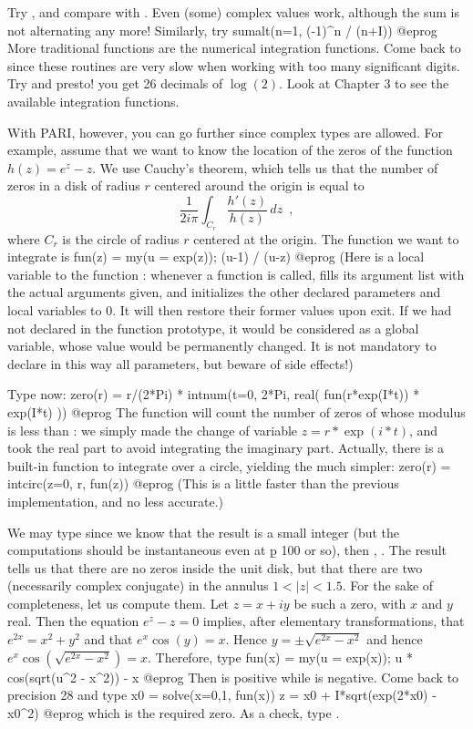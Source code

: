 Try , and compare with . Even (some) complex values
work, although the sum is not alternating any more! Similarly, try
\bprog
  sumalt(n=1, (-1)^n / (n+I))
@eprog
\medskip
More traditional functions are the numerical integration functions.
Come back to  since these routines are very slow when working
with too many significant digits. Try 
and presto! you get 26 decimals of $\log(2)$. Look at Chapter 3 to see the
available integration functions.

With PARI, however, you can go further since complex types are allowed.
For example, assume that we want to know the location of the zeros of the
function $h(z)=e^z-z$. We use Cauchy's theorem, which tells us that the
number of zeros in a disk of radius $r$ centered around the origin is
equal to
$$\dfrac{1}{2i\pi}\int_{C_r}\dfrac{h'(z)}{h(z)}\,dz\enspace,$$
where $C_r$ is the circle of radius $r$ centered at the origin.
The function we want to integrate is
\bprog
  fun(z) = my(u = exp(z)); (u-1) / (u-z)
@eprog\noindent
(Here  is a local variable to the function : whenever
a function is called,  fills its argument list with the actual arguments
given, and initializes the other declared parameters and local variables to
0. It will then restore their former values upon exit. If we had not declared
 in the function prototype, it would be considered as a global
variable, whose value would be permanently changed. It is not mandatory to
declare in this way all parameters, but beware of side effects!)

Type now:
\bprog
  zero(r) = r/(2*Pi) * intnum(t=0, 2*Pi, real( fun(r*exp(I*t)) * exp(I*t) ))
@eprog
The function  will count the number of zeros of 
whose modulus is less than : we simply made the change of variable
$z = r*\exp(i*t)$, and took the real part to avoid integrating the
imaginary part. Actually, there is a built-in function 
to integrate over a circle, yielding the much simpler:
\bprog
  zero(r) = intcirc(z=0, r, fun(z))
@eprog
(This is a little faster than the previous implementation, and no less
accurate.)

We may type  since we know that the result is a small integer
(but the computations should be instantaneous even at \b{p} 100 or so),
then , . The result tells us that there are
no zeros inside the unit disk, but that there are two (necessarily
complex conjugate) in the annulus $1<|z|<1.5$. For the sake of
completeness, let us compute them. Let $z = x+iy$ be such a zero, with
$x$ and $y$ real. Then the equation $e^z-z=0$ implies, after elementary
transformations, that $e^{2x}=x^2+y^2$ and that $e^x\cos(y)=x$. Hence
$y=\pm\sqrt{e^{2x}-x^2}$ and hence $e^x\cos(\sqrt{e^{2x}-x^2})=x$.
Therefore, type
\bprog
  fun(x) = my(u = exp(x)); u * cos(sqrt(u^2 - x^2)) - x
@eprog\noindent
Then  is positive while  is negative. Come
back to precision 28 and type
\bprog
  x0 = solve(x=0,1, fun(x))
  z = x0 + I*sqrt(exp(2*x0) - x0^2)
@eprog\noindent
which is the required zero. As a check, type .

